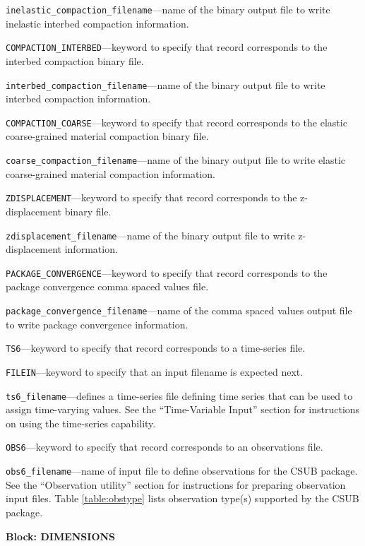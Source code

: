 \begin{description}
\item \texttt{inelastic\_compaction\_filename}---name of the binary output file to write inelastic interbed compaction information.

\item \texttt{COMPACTION\_INTERBED}---keyword to specify that record corresponds to the interbed compaction binary file.

\item \texttt{interbed\_compaction\_filename}---name of the binary output file to write interbed compaction information.

\item \texttt{COMPACTION\_COARSE}---keyword to specify that record corresponds to the elastic coarse-grained material compaction binary file.

\item \texttt{coarse\_compaction\_filename}---name of the binary output file to write elastic coarse-grained material compaction information.

\item \texttt{ZDISPLACEMENT}---keyword to specify that record corresponds to the z-displacement binary file.

\item \texttt{zdisplacement\_filename}---name of the binary output file to write z-displacement information.

\item \texttt{PACKAGE\_CONVERGENCE}---keyword to specify that record corresponds to the package convergence comma spaced values file.

\item \texttt{package\_convergence\_filename}---name of the comma spaced values output file to write package convergence information.

\item \texttt{TS6}---keyword to specify that record corresponds to a time-series file.

\item \texttt{FILEIN}---keyword to specify that an input filename is expected next.

\item \texttt{ts6\_filename}---defines a time-series file defining time series that can be used to assign time-varying values. See the ``Time-Variable Input'' section for instructions on using the time-series capability.

\item \texttt{OBS6}---keyword to specify that record corresponds to an observations file.

\item \texttt{obs6\_filename}---name of input file to define observations for the CSUB package. See the ``Observation utility'' section for instructions for preparing observation input files. Table \ref{table:obstype} lists observation type(s) supported by the CSUB package.

\end{description}
\item \textbf{Block: DIMENSIONS}

